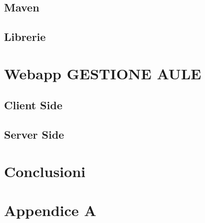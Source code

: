 \documentclass[a4paper,pt11,oneside]{book}
\begin{document}
\section{Maven}


\section{Librerie}


\chapter{Webapp GESTIONE AULE}


\section{Client Side}



\FloatBarrier





\section{Server Side}



\chapter{Conclusioni}


\chapter{Appendice A}



\end{document}
